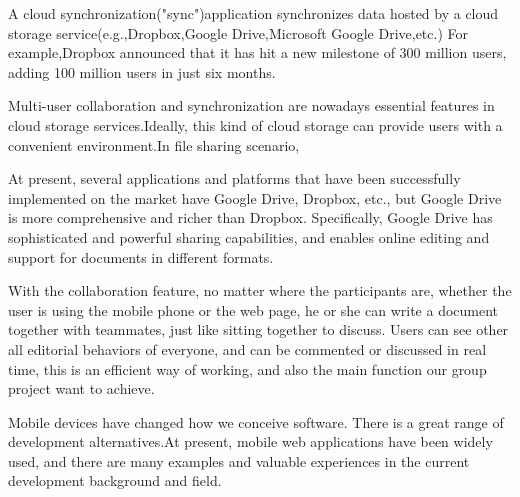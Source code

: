 \noindent A cloud synchronization("sync")application synchronizes data hosted by a cloud storage service(e.g.,Dropbox,Google Drive,Microsoft Google Drive,etc.) For example,Dropbox announced that it has hit a new milestone of 300 million users, adding 100 million users in just six months.\citep{7417235}

\vspace{0.2cm}
\noindent Multi-user collaboration and synchronization are nowadays essential features in cloud storage services.\citep{MOSCICKI20181052}Ideally, this kind of cloud storage can provide users with a convenient environment.In file sharing scenario, 


\vspace{0.2cm}
\noindent At present, several applications and platforms that have been successfully implemented on the market have Google Drive, Dropbox, etc., but Google Drive is more comprehensive and richer than Dropbox. Specifically, Google Drive has sophisticated and powerful sharing capabilities, and enables online editing and support for documents in different formats.

\begin{comment}
Jakub T. Mo艣cicki, Luca Mascetti,
Cloud storage services for file synchronization and sharing in science, education and research,
Future Generation Computer Systems,
Volume 78, Part 3,
2018,
Pages 1052-1054,
ISSN 0167-739X,
https://doi.org/10.1016/j.future.2017.09.019.
\end{comment}

\vspace{0.2cm}
\noindent With the collaboration feature, no matter where the participants are, whether the user is using the mobile phone or the web page, he or she can write a document together with teammates, just like sitting together to discuss. Users can see other all editorial behaviors of everyone, and can be commented or discussed in real time, this is an efficient way of working, and also the main function our group project want to achieve.

\vspace{0.2cm}
\noindent Mobile devices have changed how we conceive software. There is a great range of development alternatives.At present, mobile web applications have been widely used, and there are many examples and valuable experiences in the current development background and field.\citep{7128878}






